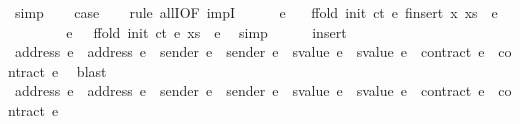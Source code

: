 \begin{isabellebody}
\ simp\isanewline
\ \ \isamarkupfalse%
\ {\isacharquery}{\kern0pt}case\isanewline
\ \ \isamarkupfalse%
\ {\isacharparenleft}{\kern0pt}rule\ allI{\isacharbrackleft}{\kern0pt}OF\ impI{\isacharbrackright}{\kern0pt}{\isacharparenright}{\kern0pt}\isanewline
\ \ \ \ \isamarkupfalse%
\ e{\isacharprime}{\kern0pt}\ \isamarkupfalse%
\ {\isacharasterisk}{\kern0pt}{\isacharasterisk}{\kern0pt}{\isacharcolon}{\kern0pt}\ {\isachardoublequoteopen}ffold\ {\isacharparenleft}{\kern0pt}init\ ct{\isacharparenright}{\kern0pt}\ e\ {\isacharparenleft}{\kern0pt}finsert\ x\ xs{\isacharparenright}{\kern0pt}\ {\isacharequal}{\kern0pt}\ e{\isacharprime}{\kern0pt}{\isachardoublequoteclose}\isanewline
\ \ \ \ \isamarkupfalse%
\ {\isacharasterisk}{\kern0pt}\ \isamarkupfalse%
\ e{\isacharprime}{\kern0pt}{\isacharprime}{\kern0pt}\ \ {\isacharasterisk}{\kern0pt}{\isacharasterisk}{\kern0pt}{\isacharasterisk}{\kern0pt}{\isacharcolon}{\kern0pt}\ {\isachardoublequoteopen}ffold\ {\isacharparenleft}{\kern0pt}init\ ct{\isacharparenright}{\kern0pt}\ e\ xs\ {\isacharequal}{\kern0pt}\ e{\isacharprime}{\kern0pt}{\isacharprime}{\kern0pt}{\isachardoublequoteclose}\ \isamarkupfalse%
\ simp\isanewline
\ \ \ \ \isamarkupfalse%
\ insert\ \isamarkupfalse%
\ {\isachardoublequoteopen}address\ e{\isacharprime}{\kern0pt}{\isacharprime}{\kern0pt}\ {\isacharequal}{\kern0pt}\ address\ e\ {\isasymand}\ sender\ e{\isacharprime}{\kern0pt}{\isacharprime}{\kern0pt}\ {\isacharequal}{\kern0pt}\ sender\ e\ {\isasymand}\ svalue\ e{\isacharprime}{\kern0pt}{\isacharprime}{\kern0pt}\ {\isacharequal}{\kern0pt}\ svalue\ e\ {\isasymand}\ contract\ e{\isacharprime}{\kern0pt}{\isacharprime}{\kern0pt}\ {\isacharequal}{\kern0pt}\ contract\ e{\isachardoublequoteclose}\ \isamarkupfalse%
\ blast\isanewline
\ \ \ \ \isamarkupfalse%
\ {\isacharasterisk}{\kern0pt}\ {\isacharasterisk}{\kern0pt}{\isacharasterisk}{\kern0pt}\ {\isacharasterisk}{\kern0pt}{\isacharasterisk}{\kern0pt}{\isacharasterisk}{\kern0pt}\ \isamarkupfalse%
\ {\isachardoublequoteopen}address\ e{\isacharprime}{\kern0pt}\ {\isacharequal}{\kern0pt}\ address\ e\ {\isasymand}\ sender\ e{\isacharprime}{\kern0pt}\ {\isacharequal}{\kern0pt}\ sender\ e\ {\isasymand}\ svalue\ e{\isacharprime}{\kern0pt}\ {\isacharequal}{\kern0pt}\ svalue\ e\ {\isasymand}\ contract\ e{\isacharprime}{\kern0pt}\ {\isacharequal}{\kern0pt}\ contract\ e{\isachardoublequoteclose}\ \isamarkupfalse%

\end{isabellebody}
